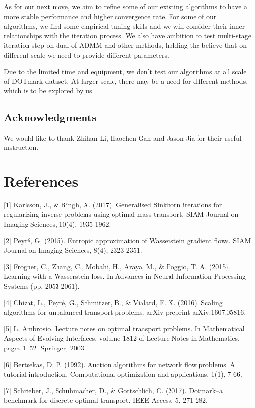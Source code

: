 \documentclass{article}
\begin{document}
\begin{large}
As for our next move, we aim to refine some of our existing algorithms to have a more stable performance and higher convergence rate. For some of our algorithms, we find some empirical tuning skills and we will consider their inner relationships with the iteration process. We also have ambition to test multi-stage iteration step on dual of ADMM and other methods, holding the believe that on different scale we need to provide different parameters.

Due to the limited time and equipment, we don't test our algorithms at all scale of DOTmark dataset.  At larger scale, there may be a need for different methods, which is to be explored by us. 


\end{large}
\subsection*{Acknowledgments}
We would like to thank Zhihan Li, Haochen Gan and Jason Jia for their useful instruction.

\section*{References}
\medskip

[1] Karlsson, J., \& Ringh, A. (2017). Generalized Sinkhorn iterations for regularizing inverse problems using optimal mass transport. SIAM Journal on Imaging Sciences, 10(4), 1935-1962.

[2] Peyré, G. (2015). Entropic approximation of Wasserstein gradient flows. SIAM Journal on Imaging Sciences, 8(4), 2323-2351.

[3] Frogner, C., Zhang, C., Mobahi, H., Araya, M., \& Poggio, T. A. (2015). Learning with a Wasserstein loss. In Advances in Neural Information Processing Systems (pp. 2053-2061).

[4] Chizat, L., Peyré, G., Schmitzer, B., \& Vialard, F. X. (2016). Scaling algorithms for unbalanced transport problems. arXiv preprint arXiv:1607.05816.
 
 [5] L. Ambrosio. Lecture notes on optimal transport problems. In Mathematical Aspects of Evolving Interfaces, volume 1812 of Lecture Notes in Mathematics, pages 1–52. Springer, 2003
 
 [6] Bertsekas, D. P. (1992). Auction algorithms for network flow problems: A tutorial introduction. Computational optimization and applications, 1(1), 7-66.
 
 [7] Schrieber, J., Schuhmacher, D., \& Gottschlich, C. (2017). Dotmark–a benchmark for discrete optimal transport. IEEE Access, 5, 271-282.
 
\end{document}
